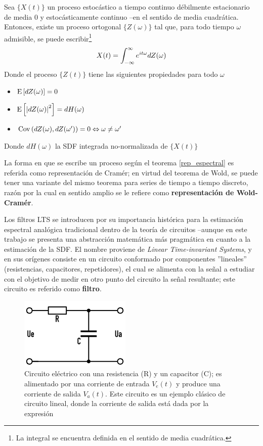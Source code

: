 \begin{thrm}
Sea $\{X(t)\}$ un proceso estoc\'astico a tiempo continuo d\'ebilmente estacionario
de media 0
y estoc\'asticamente continuo --en el 
sentido de media cuadr\'atica. Entonces, existe un proceso ortogonal $\{Z(\omega)\}$ tal que, para 
todo tiempo $\omega$ admisible, se puede escribir\footnote{La integral se encuentra definida en el
sentido de media cuadr\'atica.}
\begin{equation*}
X(t) = \int_{-\infty}^{\infty} e^{i t \omega} dZ(\omega)
\end{equation*}
Donde el proceso $\{Z(t)\}$ tiene las siguientes propiedades para todo $\omega$
\begin{itemize}
\item $\mathrm{E}\left[ dZ(\omega) \right] = 0$
\item $\mathrm{E}\left[ \left| dZ(\omega) \right|^{2} \right] = dH(\omega)$
\item $\mathrm{Cov}\left( dZ(\omega),dZ(\omega^{\prime}) \right) = 0 \Leftrightarrow \omega \neq \omega^{\prime}$
\end{itemize}
Donde $dH(\omega)$ la SDF integrada no-normalizada de $\{X(t)\}$
\label{rep_espectral}
\end{thrm}

La forma en que se escribe un proceso seg\'un el teorema \ref{rep_espectral} es referida como
{representaci\'on de Cram\'er}; en virtud del teorema de Wold, se puede tener una variante
del mismo teorema para series de tiempo a tiempo discreto, raz\'on por la cual
en sentido amplio se le refiere como \textbf{representaci\'on de Wold-Cram\'er}.

Los filtros LTS se introducen por su importancia 
hist\'orica 
para la estimaci\'on espectral
anal\'ogica tradicional dentro de la teor\'ia de circuitos --aunque en este trabajo se presenta
una abstracci\'on matem\'atica m\'as pragm\'atica en cuanto a la estimaci\'on de la SDF.
El nombre proviene de \textit{Linear Time-invariant Systems}, y en sus or\'igenes consiste en
un circuito conformado por componentes ''lineales'' (resistencias, capacitores, repetidores),
el cual se alimenta con la se\~nal a estudiar con el objetivo de medir en otro punto del
circuito la se\~nal resultante; este circuito es referido como \textbf{filtro}.

\begin{figure}
\centering
\includegraphics[width=0.6\linewidth]{rc.png} 
\caption{Circuito el\'ectrico con una resistencia (R) y un capacitor (C); es alimentado por
una corriente de entrada $V_e(t)$ y produce una corriente de salida $V_a(t)$. 
Este circuito es un 
ejemplo cl\'asico de circuito lineal, donde la corriente de salida est\'a dada por la expresi\'on
}
\label{rrcc}
\end{figure}

